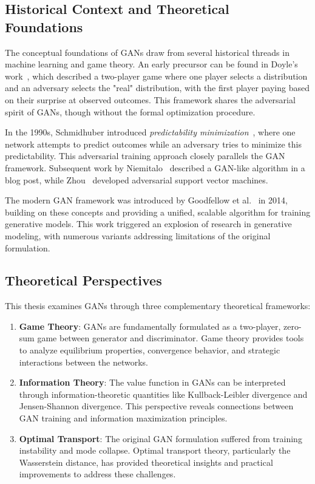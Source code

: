 \subsection{Historical Context and Theoretical Foundations}

The conceptual foundations of GANs draw from several historical threads in machine learning and game theory. An early precursor can be found in Doyle's work~\cite{ref:doyle}, which described a two-player game where one player selects a distribution and an adversary selects the "real" distribution, with the first player paying based on their surprise at observed outcomes. This framework shares the adversarial spirit of GANs, though without the formal optimization procedure.

In the 1990s, Schmidhuber introduced \textit{predictability minimization}~\cite{ref:schmidhuber-1992,ref:schmidhuber-2018}, where one network attempts to predict outcomes while an adversary tries to minimize this predictability. This adversarial training approach closely parallels the GAN framework. Subsequent work by Niemitalo~\cite{ref:niemitalo-2010} described a GAN-like algorithm in a blog post, while Zhou~\cite{ref:zhou-2012} developed adversarial support vector machines.

The modern GAN framework was introduced by Goodfellow et al.~\cite{ref:goodfellow-original} in 2014, building on these concepts and providing a unified, scalable algorithm for training generative models. This work triggered an explosion of research in generative modeling, with numerous variants addressing limitations of the original formulation.

\subsection{Theoretical Perspectives}

This thesis examines GANs through three complementary theoretical frameworks:

\begin{enumerate}
  \item \textbf{Game Theory}: GANs are fundamentally formulated as a two-player, zero-sum game between generator and discriminator. Game theory provides tools to analyze equilibrium properties, convergence behavior, and strategic interactions between the networks.
  
  \item \textbf{Information Theory}: The value function in GANs can be interpreted through information-theoretic quantities like Kullback-Leibler divergence and Jensen-Shannon divergence. This perspective reveals connections between GAN training and information maximization principles.
  
  \item \textbf{Optimal Transport}: The original GAN formulation suffered from training instability and mode collapse. Optimal transport theory, particularly the Wasserstein distance, has provided theoretical insights and practical improvements to address these challenges.
\end{enumerate}

